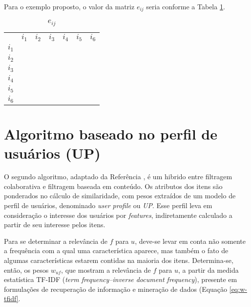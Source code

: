 Para o exemplo proposto, o valor da matriz $e_{ij}$ seria conforme a Tabela \ref{tab:eij_fw}.

\begin{table}[H]
\begin{center}
    \caption{$e_{ij}$}
    \label{tab:eij_fw}
    \begin{tabular}{ | c | c | c | c | c | c | c | } 
    \hline
     & $i_1$ & $i_2$ & $i_3$ & $i_4$ & $i_5$ & $i_6$  \\ %
     $i_1$ &  &  &  & & &  \\ \hline
     $i_2$ &  &  &  & & &  \\ \hline
     $i_3$ &  &  &  & & &  \\ \hline
     $i_4$ &  &  &  & & &  \\ \hline
     $i_5$ &  &  &  & & &  \\ \hline
     $i_6$ &  &  &  & & &  \\ \hline
    \end{tabular}
\end{center}
\end{table}

\section{Algoritmo baseado no perfil de usuários (UP)} %
\label{sec:algoritmo_baseado_no_perfil_de_usu_rios_}


O segundo algoritmo, adaptado da Referência , é um hibrido entre filtragem colaborativa e filtragem baseada em conteúdo. Os atributos dos itens são ponderados no cálculo de similaridade, com pesos extraídos de um modelo de perfil de usuários, denominado \textit{user profile} ou \textit{UP}. Esse perfil leva em consideração o interesse dos usuários por \textit{features}, indiretamente calculado a partir de seu interesse pelos itens. 

Para se determinar a relevância de $f$ para $u$, deve-se levar em conta não somente a frequência com a qual uma característica aparece, mas também o fato de algumas características estarem contidas na maioria dos itens. Determina-se, então, os pesos $w_{uf}$, que mostram a relevância de $f$ para $u$, a partir da medida estatística TF-IDF (\textit{term frequency--inverse document frequency}), presente em formulações de recuperação de informação e mineração de dados (Equação \ref{eq:w-tfidf}. 

